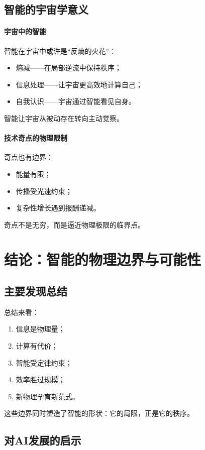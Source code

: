 \subsection{智能的宇宙学意义}

\paragraph{宇宙中的智能}
智能在宇宙中或许是“反熵的火花”：
\begin{itemize}
\item 熵减——在局部逆流中保持秩序；
\item 信息处理——让宇宙更高效地计算自己；
\item 自我认识——宇宙通过智能看见自身。
\end{itemize}
智能让宇宙从被动存在转向主动觉察。

\paragraph{技术奇点的物理限制}
奇点也有边界：
\begin{itemize}
\item 能量有限；
\item 传播受光速约束；
\item 复杂性增长遇到报酬递减。
\end{itemize}
奇点不是无穷，而是逼近物理极限的临界点。

\section{结论：智能的物理边界与可能性}

\subsection{主要发现总结}

总结来看：
\begin{enumerate}
\item 信息是物理量；
\item 计算有代价；
\item 智能受定律约束；
\item 效率胜过规模；
\item 新物理孕育新范式。
\end{enumerate}
这些边界同时塑造了智能的形状：它的局限，正是它的秩序。

\subsection{对AI发展的启示}

